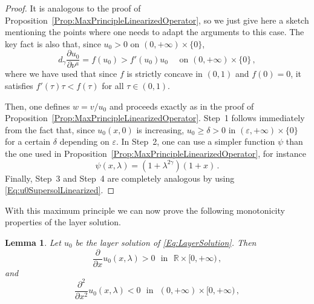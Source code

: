 \documentclass[12pt,reqno]{amsart}
\newtheorem{lemma}[theorem]{Lemma}
\theoremstyle{definition}
\theoremstyle{remark}
\newcommand{\con}[1]{\mathbb{#1}}
\newcommand{\R}{\con{R}} %
\newcommand{\s}{\gamma}
\numberwithin{equation}{section}
\begin{document}
\begin{proof}
It is analogous to the proof of Proposition~\ref{Prop:MaxPrincipleLinearizedOperator}, so we just give here a sketch mentioning the points where one needs to adapt the arguments to this case. The key fact is also that, since $u_0>0$ on $(0,+\infty)\times\{0\}$,
\begin{equation}
\label{Eq:u0SupersolLinearized}
d_\s \dfrac{\partial u_0}{\partial \nu^a}  = f(u_0) > f'(u_0) u_0 \quad \textrm{ on } (0, +\infty)\times \{0\}\,,
\end{equation}
where we have used that since $f$ is strictly concave in $(0,1)$ and $f(0)=0$, it satisfies $f'(\tau)\tau < f(\tau)$ for all $\tau\in (0,1)$.

Then, one defines $w = v/u_0$ and proceeds exactly as in the proof of Proposition~\ref{Prop:MaxPrincipleLinearizedOperator}. Step~1 follows immediately from the fact that, since $u_0(x,0)$ is increasing, $u_0 \geq \delta > 0$ in $(\varepsilon, +\infty)\times \{0\}$ for a certain $\delta$ depending on $\varepsilon$. In Step~2, one can use a simpler function $\psi$ than the one used in Proposition~\ref{Prop:MaxPrincipleLinearizedOperator}, for instance 
$$
\psi(x,\lambda) = (1+\lambda^{2\s})(1+x)\,.
$$
Finally, Step~3 and Step~4 are completely analogous by using \eqref{Eq:u0SupersolLinearized}.
\end{proof}

With this maximum principle we can now prove the following monotonicity properties of the layer solution.

\begin{lemma}
\label{Lemma:MonotonicityLayer}
Let $u_0$ be the layer solution of \eqref{Eq:LayerSolution}. Then
$$ \frac{\partial}{\partial x} u_0(x,\lambda) > 0 \ \ \ \text{in} \ \ \ \R\times [0,+\infty)\,, $$
and
$$ \frac{\partial^2}{\partial x^2} u_0(x,\lambda) < 0 \ \ \ \text{in} \ \ \ (0,+\infty)\times [0,+\infty)\,, $$
\end{lemma}
\end{document}
